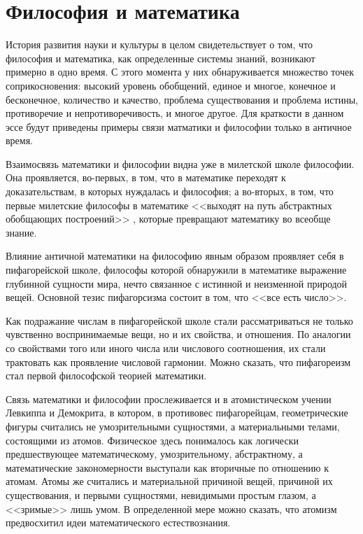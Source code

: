 \documentclass[a4page]{article}
\begin{document}
\section{Философия и математика}
История развития науки и культуры в целом свидетельствует о том,
что философия и математика, как определенные системы знаний,
возникают примерно в одно время.
С этого момента у них обнаруживается множество точек соприкосновения:
высокий уровень обобщений, единое и многое, конечное и бесконечное,
количество и качество, проблема существования и проблема истины,
противоречие и непротиворечивость, и многое другое.
Для краткости в данном эссе будут приведены примеры связи матматики и философии только в античное время.

Взаимосвязь математики и философии видна уже в милетской школе философии.
Она проявляется, во-первых, в том, что в математике переходят к доказательствам,
в которых нуждалась и философия;
а во-вторых, в том, что первые милетские философы в математике
<<выходят на путь абстрактных обобщающих построений>> \cite{birth-development-of-ideas},
которые превращают математику во всеобще знание.

Влияние античной математики на философию явным образом проявляет себя в пифагорейской школе,
философы которой обнаружили в математике выражение глубинной сущности мира,
нечто связанное с истинной и неизменной природой вещей.
Основной тезис пифагорсизма состоит в том, что <<все есть число>>.

Как подражание числам в пифагорейской школе стали рассматриваться
не только чувственно воспринимаемые вещи, но и их свойства, и отношения.
По аналогии со свойствами того или иного числа или числового соотношения,
их стали трактовать как проявление числовой гармонии.
Можно сказать, что пифагореизм стал первой философской теорией математики.

Связь математики и философии прослеживается и в атомистическом
учении Левкиппа и Демокрита, в котором, в противовес пифагорейцам,
геометрические фигуры считались не умозрительными сущностями,
а материальными телами, состоящими из атомов.
Физическое здесь понималось как логически предшествующее математическому,
умозрительному, абстрактному,
а математические закономерности выступали как вторичные по отношению к атомам.
Атомы же считались и материальной причиной вещей, причиной их существования,
и первыми сущностями, невидимыми простым глазом, а <<зримые>> лишь умом.
В определенной мере можно сказать, что атомизм предвосхитил идеи математического естествознания.
\end{document}

